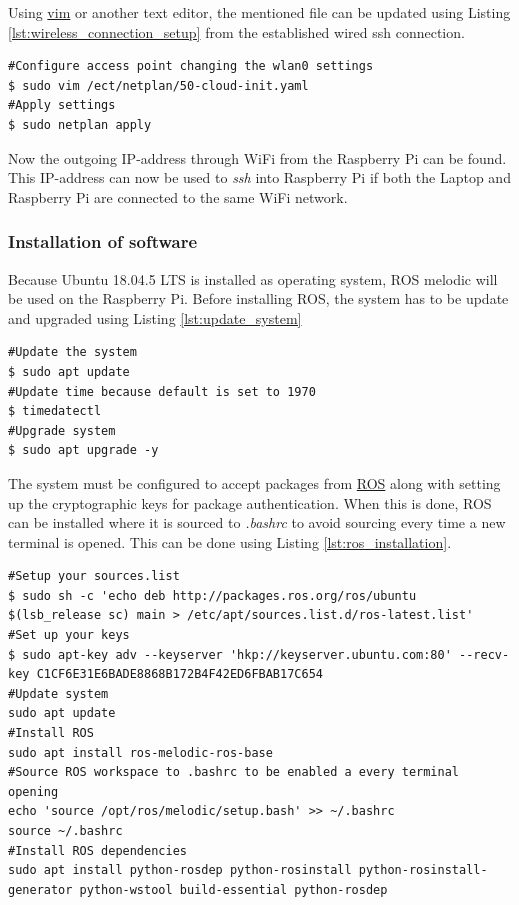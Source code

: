 \documentclass[../Head/report.tex]{subfiles}
\begin{document}
Using \href{https://www.vim.org/}{vim} or another text editor, the mentioned file can be updated using Listing \ref{lst:wireless_connection_setup} from the established wired ssh connection.  

\begin{lstlisting}[frame=none, caption={Create an access point from a wireless connection by configuring netplan},label=lst:wireless_connection_setup]
#Configure access point changing the wlan0 settings
$ sudo vim /ect/netplan/50-cloud-init.yaml
#Apply settings  
$ sudo netplan apply
\end{lstlisting}

Now the outgoing IP-address through WiFi from the Raspberry Pi can be found. This IP-address can now be used to \textit{ssh} into Raspberry Pi if both the Laptop and Raspberry Pi are connected to the same WiFi network.

\subsubsection{Installation of software}

Because Ubuntu 18.04.5 LTS is installed as operating system, ROS melodic will be used on the Raspberry Pi. Before installing ROS, the system has to be update and upgraded using Listing \ref{lst:update_system}

\begin{lstlisting}[frame=none, caption={Updating the system before software installation},label=lst:update_system]
#Update the system
$ sudo apt update
#Update time because default is set to 1970
$ timedatectl 
#Upgrade system 
$ sudo apt upgrade -y
\end{lstlisting} 

The system must be configured to accept packages from \href{http://wiki.ros.org/melodic/Installation/Ubuntu}{ROS} along with setting up the cryptographic keys for package authentication. When this is done, ROS can be installed where it is sourced to \textit{.bashrc} to avoid sourcing every time a new terminal is opened. This can be done using Listing \ref{lst:ros_installation}. 

\begin{lstlisting}[frame=none, caption={ROS installation and source to \textit{.bashrc}},label=lst:ros_installation]
#Setup your sources.list
$ sudo sh -c 'echo deb http://packages.ros.org/ros/ubuntu $(lsb_release sc) main > /etc/apt/sources.list.d/ros-latest.list'
#Set up your keys
$ sudo apt-key adv --keyserver 'hkp://keyserver.ubuntu.com:80' --recv-key C1CF6E31E6BADE8868B172B4F42ED6FBAB17C654
#Update system
sudo apt update
#Install ROS
sudo apt install ros-melodic-ros-base
#Source ROS workspace to .bashrc to be enabled a every terminal opening
echo 'source /opt/ros/melodic/setup.bash' >> ~/.bashrc
source ~/.bashrc
#Install ROS dependencies 
sudo apt install python-rosdep python-rosinstall python-rosinstall-generator python-wstool build-essential python-rosdep
\end{lstlisting}
\end{document}
